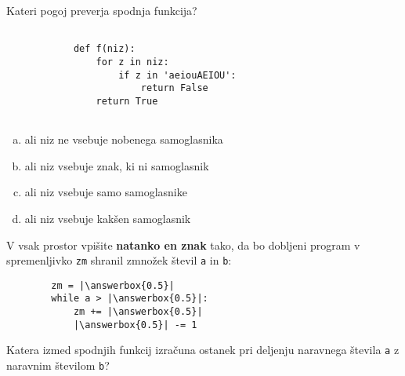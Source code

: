 \documentclass[arhiv, 10pt]{../izpit}
\newcommand{\inlinepy}[1]{\texttt{#1}}
\newcommand{\answerbox}[1]{\framebox{\vphantom{\large M}\hspace{#1cm}}}
\begin{document}
        \naloga*

        \begin{multicols}{2}
        \noindent
        Kateri pogoj preverja spodnja funkcija?
        \begin{verbatim}
        
            def f(niz):
                for z in niz:
                    if z in 'aeiouAEIOU':
                        return False
                return True
            
        \end{verbatim}

        \begin{enumerate}[(a)]
\item ali niz ne vsebuje nobenega samoglasnika
\item ali niz vsebuje znak, ki ni samoglasnik
\item ali niz vsebuje samo samoglasnike
\item ali niz vsebuje kakšen samoglasnik
\end{enumerate}

        \end{multicols}
    
        \naloga*
        \begin{multicols}{2}
        \noindent
        V vsak prostor vpišite \textbf{natanko en znak} tako, da bo dobljeni program v spremenljivko \inlinepy{zm} shranil zmnožek števil \inlinepy{a} in \inlinepy{b}:
        
        \columnbreak
        \begin{verbatim}
        zm = |\answerbox{0.5}|
        while a > |\answerbox{0.5}|:
            zm += |\answerbox{0.5}|
            |\answerbox{0.5}| -= 1
        \end{verbatim}
        \end{multicols}
    
        \clearpage
        \naloga
        
        Katera izmed spodnjih funkcij izračuna ostanek pri deljenju naravnega števila \inlinepy{a} z naravnim številom \inlinepy{b}?
    
\end{document}
